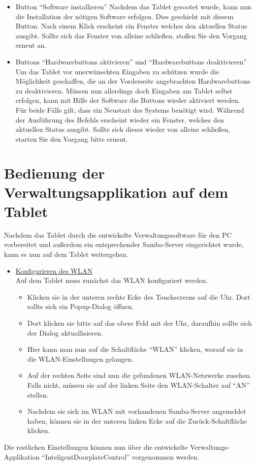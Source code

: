 \begin{flushleft}
\begin{itemize}
  \item Button ``Software installieren''
    \subitem Nachdem das Tablet gerootet wurde, kann nun die Installation der nötigen Software erfolgen. Dies geschieht mit diesem Button. 	
	     Nach einem Klick erscheint ein Fenster welches den aktuellen Status ausgibt. Sollte sich das Fenster von alleine schließen, stoßen Sie den Vorgang erneut an. 
	 
  \item Buttons ``Hardwarebuttons aktivieren'' und ``Hardwarebuttons deaktivieren''
    \subitem Um das Tablet vor unerwünschten Eingaben zu schützen wurde die Möglichkeit geschaffen, die an der Vorderseite angebrachten 	
             Hardwarebuttons zu deaktivieren. Müssen nun allerdings doch Eingaben am Tablet selbst erfolgen, kann mit Hilfe der Software die Buttons wieder aktiviert werden. Für beide Fälle gilt, dass ein Neustart des Systems benötigt wird. Während der Ausführung des Befehls erscheint wieder ein Fenster, welches den aktuellen Status ausgibt. Sollte sich dieses wieder von alleine schließen, starten Sie den Vorgang bitte erneut.
\end{itemize}


\section{Bedienung der Verwaltungsapplikation auf dem Tablet}
  Nachdem das Tablet durch die entwickelte Verwaltungssoftware für den PC vorbereitet und außerdem ein entsprechender Samba-Server eingerichtet wurde, kann es nun auf dem Tablet weitergehen.
  \begin{itemize}
  \item{\underline{Konfigurieren des WLAN}}\\ \vspace{0.3cm}
    Auf dem Tablet muss zunächst das WLAN konfiguriert werden.
    \begin{itemize}
      \item Klicken sie in der unteren rechte Ecke des Touchscreens auf die Uhr. Dort sollte sich ein Popup-Dialog öffnen.
      \item Dort klicken sie bitte auf das obere Feld mit der Uhr, daraufhin sollte sich der Dialog aktuallisieren.
      \item Hier kann man nun auf die Schaltfläche ``WLAN'' klicken, worauf sie in die WLAN-Einstellungen gelangen.
      \item Auf der rechten Seite sind nun die gefundenen WLAN-Netzwerke zusehen. Falls nicht, müssen sie auf der linken Seite den WLAN-Schalter auf ``AN'' stellen.
      \item Nachdem sie sich im WLAN mit vorhandenen Samba-Server angemeldet haben, können sie in der unteren linken Ecke auf die Zurück-Schaltfläche klicken.
    \end{itemize}
  \end{itemize}
  Die restlichen Einstellungen können nun über die entwickelte Verwaltungs-Applikation ``InteligentDoorplateControl'' vorgenommen werden.

\end{flushleft}
